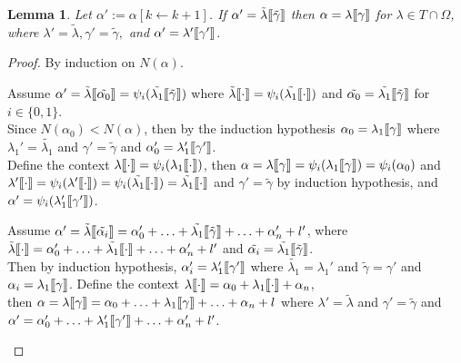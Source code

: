 \documentclass{amsart}
\theoremstyle{plain}
\theoremstyle{plain}
\newtheorem{lemma}[theorem]{Lemma}
\def\scbrl{[\hspace{-.14em}[}
\def\scbrr{]\hspace{-.14em}]}
\def\scbr#1{\scbrl#1\scbrr}
\newcommand{\kp}{[k\leftarrow k+1]}
\newcommand{\Om}{{\Omega}}
\newcommand{\al}{{\alpha}}
\newcommand{\ga}{\gamma}
\newcommand{\la}{\lambda}
\def\scbrl{[\hspace{-.14em}[}
\def\scbrr{]\hspace{-.14em}]}
\def\scbr#1{\scbrl#1\scbrr}
\begin{document}
\begin{lemma} \label{lm:BaseChangeContext} Let $\al':=\al\kp$.
If $\al'=\tilde{\la} \scbr{\tilde{\ga}}$ then $\al=\la\scbr{\ga}$ for $\la \in T\cap \Om$, where $\la'=\tilde{\la} , \ga'= \tilde{\ga}, $ and $\al'=\la'\scbr{\ga'}$.
\end{lemma}
\begin{proof}
By induction on $N(\al)$.
\begin{Cases}
    \item Assume $\al' =\tilde{\la}\scbr{\tilde{\al_0}} =\psi_i(\tilde{\la_1}\scbr{\tilde{\ga}})$ where $\tilde{\la}\scbr{\cdot} = \psi_i(\tilde{\la_1}\scbr{\cdot})$ and $\tilde{\al_0}=\tilde{\la_1}\scbr{\tilde{\ga}}$ for $i \in \{0,1\}$.
    \\
    Since $N(\al_0)<N(\al)$, then by the induction hypothesis $\al_0=\la_1\scbr{\ga}$ where $\la_1'=\tilde{\la_1}$ and $\ga'=\tilde{\ga}$ and $\al_0'=\la_1'\scbr{\ga'}$.\\
    Define the context $\la\scbr{\cdot} = \psi_i(\la_1\scbr{\cdot})$,
    then $\al = \la\scbr{\ga} = \psi_i(\la_1\scbr{\ga}) = \psi_i(\al_0)$
    and $\la'\scbr{\cdot} = \psi_i(\la'\scbr{\cdot})= \psi_i(\tilde{\la_1}\scbr{\cdot}) = \tilde{\la_1}\scbr{\cdot}$ 
    and $\ga'=\tilde{\ga}$ by induction hypothesis,
    and $\al'= \psi_i(\la_1'\scbr{\ga'})$.
    
    \item 
    Assume  $\al' =\tilde{\la}\scbr{\tilde{\al_i}} =  \al_0' + \ldots + \tilde{\la_1}\scbr{\tilde{\ga}} + \ldots +\al_n' +l'$, 
    where $\tilde{\la}\scbr{\cdot} = \al_0' + \ldots + \tilde{\la_1}\scbr{\cdot} +\ldots +\al_n'+l'$
    and $\tilde{\al_i} = \tilde{\la_1}\scbr{\tilde{\ga}}$.\\
    Then by induction hypothesis, $\al_i' = \la_1'\scbr{\ga'}$ where $\tilde{\la_1}= \la_1'$ and $\tilde{\ga}=\ga'$ and $\al_i=\la_1\scbr{\ga}$.
    Define the context $\la\scbr{\cdot} =  \al_0 + \la_1\scbr{\cdot} + \al_n$, 	\\
    then $\al = \la\scbr{\ga} = \al_0 + \ldots+ \la_1\scbr{\ga}+\ldots+\al_n+l$  where $\la'=\tilde{\la}$ and $\ga' = \tilde{\ga}$
    and $\al' =  \al_0' + \ldots+ \la_1'\scbr{\ga'}+ \ldots+\al_n' +l'$. 
    
\end{Cases}
\end{proof}
\end{document}

